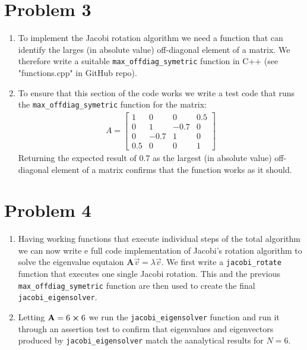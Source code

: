 \documentclass[english,notitlepage]{revtex4-1}  %
\begin{document}
\section*{Problem 3}
\begin{enumerate}[label= \alph*)]
    \item     
    To implement the Jacobi rotation algorithm we need a function that can identify the larges (in absolute value) 
    off-diagonal element of a matrix. We therefore write a suitable \texttt{max\_offdiag\_symetric} function in C++ (see "functions.cpp" in GitHub repo). 

    \item 
    To ensure that this section of the code works we write a test code that runs the \texttt{max\_offdiag\_symetric} function 
    for the matrix:
    \begin{align*}
        A = \begin{bmatrix}
            1 & 0 & 0 & 0.5 \\
            0 & 1 & -0.7 & 0 \\
            0 & -0.7 & 1 & 0 \\
            0.5 & 0 & 0 & 1 
        \end{bmatrix}
    \end{align*}
    Returning the expected result of $0.7$ as the largest (in absolute value) 
    off-diagonal element of a matrix confirms that the function works as it should. 
\end{enumerate}

\section*{Problem 4}
\begin{enumerate}[label= \alph*)]
    \item Having working functions that execute individual steps of the total algorithm we can 
    now write e full code implementation of Jacobi's rotation algorithm to solve the eigenvalue 
    equtaion $\textbf{A} \vec{v} = \lambda \vec{v}$. We first write a \texttt{jacobi\_rotate} 
    function that executes one single Jacobi rotation. This and the previous \texttt{max\_offdiag\_symetric} 
    function are then used to create the final \texttt{jacobi\_eigensolver}.
    \item Letting $\textbf{A} = 6 \cross 6$ we run the \texttt{jacobi\_eigensolver} function and run 
    it through an assertion test to confirm that eigenvalues and eigenvectors produced by \texttt{jacobi\_eigensolver} 
    match the aanalytical results for $N = 6$.
\end{enumerate}
\end{document}
